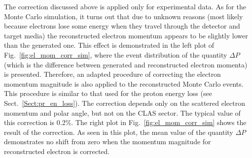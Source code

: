 The correction discussed above is applied only for experimental data. As for the Monte Carlo simulation, it turns out that due to unknown reasons (most likely because electrons lose some energy when they travel through the detector and target media) the reconstructed electron momentum appears to be slightly lower than the generated one. This effect is demonstrated in the left plot of Fig.~\ref{fig:el_mom_corr_sim}, where the event distribution of the quantity $\Delta P$ (which is the difference between generated and reconstructed electron momenta) is presented. Therefore, an adapted procedure of correcting the electron momentum magnitude is also applied to the reconstructed Monte Carlo events. This procedure is similar to that used for the proton energy loss (see Sect.~\ref{Sect:pr_en_loss}). The correction depends only on the scattered electron momentum and polar angle, but not on the CLAS sector. The typical value of this correction is 0.2\%. The right plot in Fig.~\ref{fig:el_mom_corr_sim} shows the result of the correction. As seen in this plot, the mean value of the quantity $\Delta P$ demonstrates no shift from zero when the momentum magnitude for reconstructed electron is corrected. 

